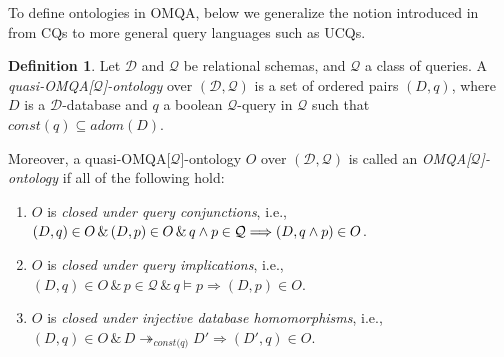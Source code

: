 \documentclass[letterpaper]{article} %
\theoremstyle{definition}
\newtheorem{defn}{Definition}
\theoremstyle{remark}
\theoremstyle{definition}
\begin{document}
To define ontologies in OMQA, below we generalize the notion introduced in~\cite{ZhangZY16} from CQs to more general query languages such as UCQs.
\begin{defn}
Let $\mathscr{D}$ and $\mathscr{Q}$ be relational schemas, and $\mathcal{Q}$ a class of queries. A {\em quasi-OMQA[$\mathcal{Q}$]-ontology} over $(\mathscr{D},\mathscr{Q})$ is a set of ordered pairs $(D,{q})$, where $D$ is a $\mathscr{D}$-database and ${q}$ a boolean $\mathscr{Q}$-query in $\mathcal{Q}$ such that $\textit{const}(q)\subseteq{adom}(D)$.

Moreover, a quasi-OMQA[$\mathcal{Q}$]-ontology $O$ over $(\mathscr{D},\mathscr{Q})$ is called an {\em OMQA[$\mathcal{Q}$]-ontology} if all of the following hold: 
\begin{enumerate}
\item $O$ is {\em closed under query conjunctions}, i.e.,\\ $(D,\hspace{-.01cm}{q})\hspace{-.01cm}\in\hspace{-.01cm} O\,\&\,(D,\hspace{-.01cm}{p})\hspace{-.01cm}\in\hspace{-.01cm} O\,\&\,{q}\wedge{p}\hspace{-.01cm}\in\hspace{-.01cm}\mathcal{Q}\Longrightarrow(D,\hspace{-.01cm}{q}\wedge{p})\hspace{-.01cm}\in\hspace{-.01cm} O$.
\item $O$ is {\em closed under query implications}, i.e.,\\ $(D,{q})\in O\,\&\,{p}\in\mathcal{Q}\,\&\,{q}\vDash p\Longrightarrow(D,p)\in O$. 
\item $O$ is {\em closed\hspace{-.01cm} under\hspace{-.01cm} injective\hspace{-.01cm} database\hspace{-.01cm} homomorphisms},\hspace{-.01cm} i.e.,\!\\ $(D,{q})\in O\,\&\,D\twoheadrightarrow_{\textit{const(q)}} D'\Longrightarrow(D',{q})\in O$. 
\end{enumerate}
\end{defn}
\end{document}
